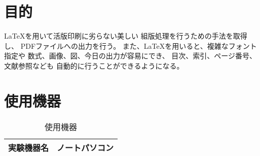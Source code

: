 \documentclass{jsarticle}
\begin{document}




\section{目的}
LaTeXを用いて活版印刷に劣らない美しい
組版処理を行うための手法を取得し、
PDFファイルへの出力を行う。
また、LaTeXを用いると、複雑なフォント指定や
数式、画像、図、今日の出力が容易にでき、
目次、索引、ページ番号、文献参照なども
自動的に行うことができるようになる。

\section{使用機器}
\begin{table}[hbtp]
 \caption{使用機器}
 \label{siyou}
 \centering
  \begin{tabular}{|c|c|}\hline
			実験機器名&ノートパソコン\\ \hline
  \end{tabular}
\end{table}
\end{document}
